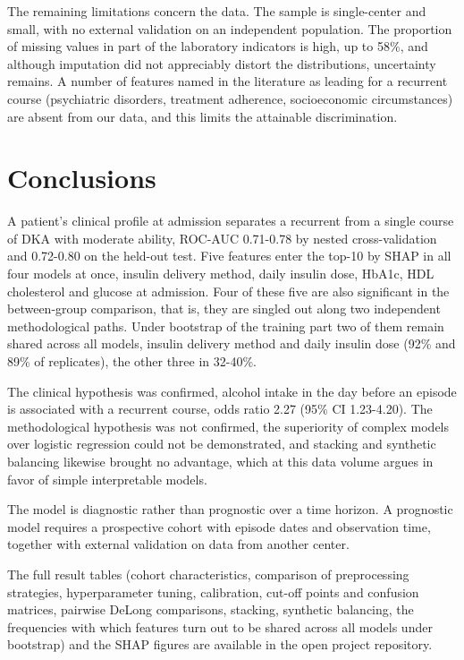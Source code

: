 \documentclass[pdflatex,sn-basic,Numbered]{sn-jnl}
\begin{document}
The remaining limitations concern the data. The sample is single-center and small, with no external validation on an independent population. The proportion of missing values in part of the laboratory indicators is high, up to 58\%, and although imputation did not appreciably distort the distributions, uncertainty remains. A number of features named in the literature as leading for a recurrent course (psychiatric disorders, treatment adherence, socioeconomic circumstances) are absent from our data, and this limits the attainable discrimination.

\section{Conclusions}\label{sec6}

A patient's clinical profile at admission separates a recurrent from a single course of DKA with moderate ability, ROC-AUC 0.71-0.78 by nested cross-validation and 0.72-0.80 on the held-out test. Five features enter the top-10 by SHAP in all four models at once, insulin delivery method, daily insulin dose, HbA1c, HDL cholesterol and glucose at admission. Four of these five are also significant in the between-group comparison, that is, they are singled out along two independent methodological paths. Under bootstrap of the training part two of them remain shared across all models, insulin delivery method and daily insulin dose (92\% and 89\% of replicates), the other three in 32-40\%.

The clinical hypothesis was confirmed, alcohol intake in the day before an episode is associated with a recurrent course, odds ratio 2.27 (95\% CI 1.23-4.20). The methodological hypothesis was not confirmed, the superiority of complex models over logistic regression could not be demonstrated, and stacking and synthetic balancing likewise brought no advantage, which at this data volume argues in favor of simple interpretable models.

The model is diagnostic rather than prognostic over a time horizon. A prognostic model requires a prospective cohort with episode dates and observation time, together with external validation on data from another center.

\backmatter


The full result tables (cohort characteristics, comparison of preprocessing strategies, hyperparameter tuning, calibration, cut-off points and confusion matrices, pairwise DeLong comparisons, stacking, synthetic balancing, the frequencies with which features turn out to be shared across all models under bootstrap) and the SHAP figures are available in the open project repository.
\end{document}

